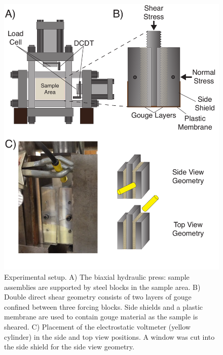 \begin{figure}
\includegraphics[width=30pc]{chap_electrical/biax_setup.pdf}
\caption{Experimental setup. A) The biaxial hydraulic press: sample assemblies are supported by steel blocks in the sample area. B) Double direct shear geometry consists of two layers of gouge confined between three forcing blocks.  Side shields and a plastic membrane are used to contain gouge material as the sample is sheared. C) Placement of the electrostatic voltmeter (yellow cylinder) in the side and top view positions.  A window was cut into the side shield for the side view geometry. }
\label{biax_setup}
\end{figure}

